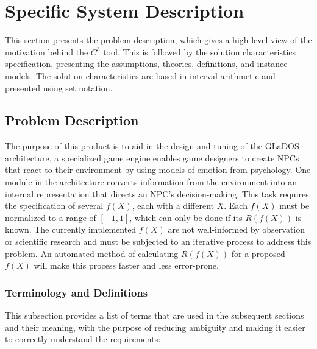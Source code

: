 \documentclass[12pt]{article}
\newcommand{\prognameAbbrv}{$C^{3}$}
\begin{document}
\section{Specific System Description}
\label{specific}
This section presents the problem description, which gives a high-level
view of the motivation behind the \prognameAbbrv{} tool. This is followed by 
the solution characteristics specification, presenting the assumptions, 
theories, definitions, and instance models. The solution characteristics are 
based in interval arithmetic and presented using set notation. 

\subsection{Problem Description} 
\label{Sec_pd}
The purpose of this product is to aid in the design and tuning of the GLaDOS 
architecture, a specialized game engine enables game designers to create NPCs 
that react to their environment by using models of emotion from psychology. One 
module in the architecture converts information from the environment into an 
internal representation that directs an NPC's decision-making. This task 
requires the specification of several $f(X)$, each with a different $X$. Each 
$f(X)$ must be normalized to a range of $[-1,1]$, which can only be 
done if its $R(f(X))$ is known. The currently implemented $f(X)$ are not 
well-informed by observation or scientific research and must be subjected to an 
iterative process to address this problem. An automated method of calculating 
$R(f(X))$ for a proposed $f(X)$ will make this process faster and less 
error-prone.

\subsubsection{Terminology and  Definitions}

This subsection provides a list of terms that are used in the subsequent
sections and their meaning, with the purpose of reducing ambiguity and making it
easier to correctly understand the requirements:
\end{document}
